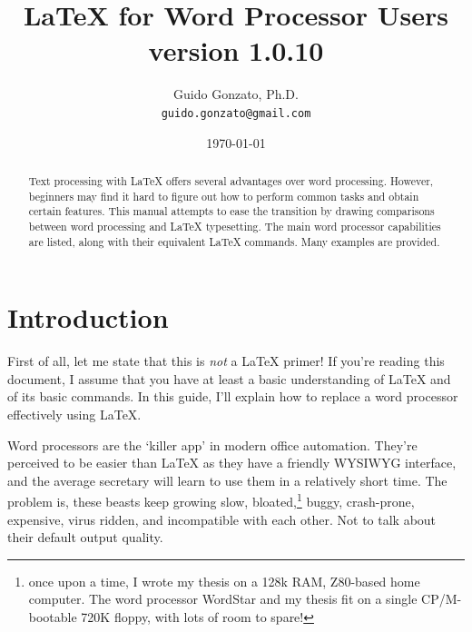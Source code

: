 \documentclass[a4paper,11pt]{article}
\def\version {1.0.10}
\newcounter{fnsym}
\begin{document}
\setlength{\parindent}{0pt}
\setlength{\parskip}{3pt}

\title{\LaTeX{} for Word Processor Users\\version \version}

\author{Guido Gonzato, Ph.D.\\
\texttt{guido.gonzato@gmail.com}}

\renewcommand{\thefootnote}{\fnsymbol{footnote}}
\setcounter{footnote}{2}

\date{\today}

\renewcommand{\thefootnote}{\arabic{footnote}}
\setcounter{footnote}{1}

\maketitle

\begin{abstract}

  Text processing with \LaTeX{} offers several advantages over word
  processing. However, beginners may find it hard to figure out how to
  perform common tasks and obtain certain features. This manual
  attempts to ease the transition by drawing comparisons between word
  processing and \LaTeX{} typesetting. The main word processor
  capabilities are listed, along with their equivalent \LaTeX{}
  commands. Many examples are provided.

\end{abstract}

\begin{footnotesize}
  \tableofcontents
  \listoftables
  \listoffigures
\end{footnotesize}



\section{Introduction}

First of all, let me state that this is \emph{not} a \LaTeX{} primer!
If you're reading this document, I assume that you have at least a
basic understanding of \LaTeX{} and of its basic commands. In this
guide, I'll explain how to replace a word processor effectively using
\LaTeX.

Word processors are the `killer app' in modern office automation.
They're perceived to be easier than \LaTeX{} as they have a friendly
WYSIWYG interface, and the average secretary will learn to use them in
a relatively short time. The problem is, these beasts keep growing
slow, bloated,\footnote{once upon a time, I wrote my thesis on a 128k
RAM, Z80-based home computer. The word processor WordStar and my
thesis fit on a single CP/M-bootable 720K floppy, with lots of room to
spare!} buggy, crash-prone, expensive, virus ridden, and incompatible
with each other. Not to talk about their default output quality.
\end{document}
